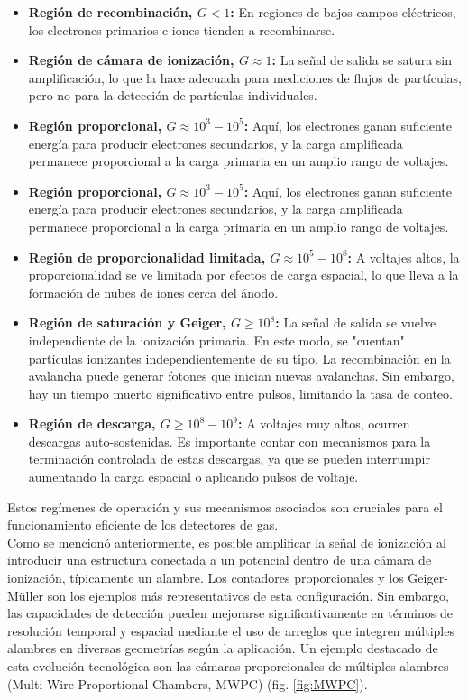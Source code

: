 \documentclass{article}
\begin{document}
\begin{itemize}
    \item \textbf{Región de recombinación, \(G < 1\):} En regiones de bajos campos eléctricos, los electrones primarios e iones tienden a recombinarse.
    \item \textbf{Región de cámara de ionización, \(G \approx 1\):} La señal de salida se satura sin amplificación, lo que la hace adecuada para mediciones de flujos de partículas, pero no para la detección de partículas individuales.
    \item \textbf{Región proporcional, \(G \approx 10^3 - 10^5\):} Aquí, los electrones ganan suficiente energía para producir electrones secundarios, y la carga amplificada permanece proporcional a la carga primaria en un amplio rango de voltajes.
    \item \textbf{Región proporcional, \(G \approx 10^3 - 10^5\):} Aquí, los electrones ganan suficiente energía para producir electrones secundarios, y la carga amplificada permanece proporcional a la carga primaria en un amplio rango de voltajes.
    \item \textbf{Región de proporcionalidad limitada, \(G \approx 10^5 - 10^8\):} A voltajes altos, la proporcionalidad se ve limitada por efectos de carga espacial, lo que lleva a la formación de nubes de iones cerca del ánodo.
    \item \textbf{Región de saturación y Geiger, \(G \geq 10^8\):} La señal de salida se vuelve independiente de la ionización primaria. En este modo, se "cuentan" partículas ionizantes independientemente de su tipo. La recombinación en la avalancha puede generar fotones que inician nuevas avalanchas. Sin embargo, hay un tiempo muerto significativo entre pulsos, limitando la tasa de conteo.
    \item \textbf{Región de descarga, \(G \geq 10^8 - 10^9\):} A voltajes muy altos, ocurren descargas auto-sostenidas. Es importante contar con mecanismos para la terminación controlada de estas descargas, ya que se pueden interrumpir aumentando la carga espacial o aplicando pulsos de voltaje.
\end{itemize}

\noindent Estos regímenes de operación y sus mecanismos asociados son cruciales para el funcionamiento eficiente de los detectores de gas.\\

\noindent Como se mencionó anteriormente, es posible amplificar la señal de ionización al introducir una estructura conectada a un potencial dentro de una cámara de ionización, típicamente un alambre. Los contadores proporcionales y los Geiger-Müller son los ejemplos más representativos de esta configuración. Sin embargo, las capacidades de detección pueden mejorarse significativamente en términos de resolución temporal y espacial mediante el uso de arreglos que integren múltiples alambres en diversas geometrías según la aplicación. Un ejemplo destacado de esta evolución tecnológica son las cámaras proporcionales de múltiples alambres (Multi-Wire Proportional Chambers, MWPC) (fig. \ref{fig:MWPC}).\\
\end{document}
